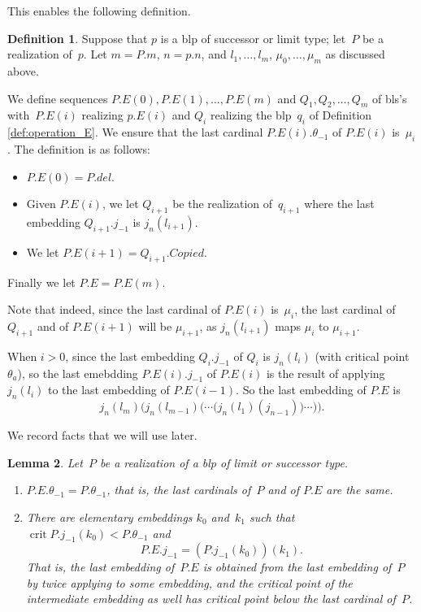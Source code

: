 \documentclass{article}
\newtheorem{lemma}{Lemma}[section]
\theoremstyle{definition}
\newtheorem{definition}[lemma]{Definition}
\theoremstyle{remark}
\DeclareMathOperator{\crit}{crit}
\begin{document}
This enables the following definition. 

\begin{definition} \label{def:E_operation_on_bls}
  Suppose that $p$ is a blp of successor or limit type; let~$P$ be a realization of~$p$. Let $m = P.m$, $n = p.n$,  and $l_1,\dots, l_m$, $\mu_0,\dots, \mu_m$ as discussed above. 

  We define sequences $P.E(0),P.E(1),\dots, P.E(m)$ and $Q_1,Q_2,\dots, Q_m$ of bls's with~$P.E(i)$ realizing $p.E(i)$ and $Q_i$ realizing the blp~$q_i$ of Definition \ref{def:operation_E}. We ensure that the last cardinal $P.E(i).\theta_{-1}$ of $P.E(i)$ is~$\mu_i$. The definition is as follows:
  \begin{itemize}
    \item $P.E(0) = P.del$.
    \item Given $P.E(i)$, we let $Q_{i+1}$ be the realization of~$q_{i+1}$ where the last embedding $Q_{i+1}.j_{-1}$ is $j_n(l_{i+1})$. 
    \item We let $P.E(i+1) = Q_{i+1}.Copied$. 
  \end{itemize}
  Finally we let $P.E = P.E(m)$. 
\end{definition}

Note that indeed, since the last cardinal of $P.E(i)$ is~$\mu_i$, the last cardinal of $Q_{i+1}$ and of $P.E(i+1)$ will be $\mu_{i+1}$, as $j_n(l_{i+1})$ maps $\mu_i$ to $\mu_{i+1}$. 

When $i>0$, since the last embedding $Q_i.j_{-1}$ of $Q_i$ is $j_n(l_i)$ (with critical point~$\theta_a$), so the last emebdding $P.E(i).j_{-1}$ of $P.E(i)$ is the result of applying $j_n(l_i)$ to the last embedding of $P.E({i-1})$. So the last embedding of $P.E$ is 
\[
  j_n(l_m) \Big( j_n(l_{m-1}) \Big( \cdots \Big(  j_n(l_1)(j_{n-1})    \Big) \cdots  \Big)  \Big).
\]

We record facts that we will use later.

\begin{lemma} \label{lem:facts_about_P.E}
  Let~$P$ be a realization of a blp of limit or successor type. 
  \begin{enumerate}
    \item $P.E.\theta_{-1} = P.\theta_{-1}$, that is, the last cardinals of~$P$ and of $P.E$ are the same. 

    \item There are elementary embeddings $k_0$ and~$k_1$ such that $\crit P.j_{-1}(k_0) < P.\theta_{-1}$ and
    \[
      P.E.j_{-1}  = (P.j_{-1}(k_0))(k_1).
    \]
    That is, the last embedding of~$P.E$ is obtained from the last embedding of~$P$ by twice applying to some embedding, and the critical point of the intermediate embedding as well has critical point below the last cardinal of~$P$. 
  \end{enumerate}
\end{lemma}
\end{document}
